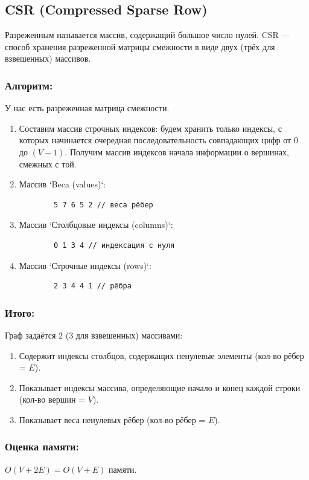 \subsection{CSR (Compressed Sparse Row)}
Разреженным называется массив, содержащий большое число нулей.
CSR --- способ хранения разреженной матрицы смежности в виде двух (трёх для взвешенных) массивов.

\subsubsection*{Алгоритм:}
У нас есть разреженная матрица смежности.
\begin{enumerate}
	\item Составим массив строчных индексов: будем хранить только индексы, с которых начинается очередная последовательность совпадающих цифр от 0 до $(V-1)$. Получим массив индексов начала информации о вершинах, смежных с той.
	\item Массив `Beca (values)`:
	\begin{verbatim}
		5 7 6 5 2 // веса рёбер
	\end{verbatim}
	\item Массив `Столбцовые индексы (columns)`:
	\begin{verbatim}
		0 1 3 4 // индексация с нуля
	\end{verbatim}
	\item Массив `Строчные индексы (rows)`:
	\begin{verbatim}
		2 3 4 4 1 // рёбра
	\end{verbatim}
\end{enumerate}

\subsubsection*{Итого:}
Граф задаётся 2 (3 для взвешенных) массивами:
\begin{enumerate}
	\item Содержит индексы столбцов, содержащих ненулевые элементы (кол-во рёбер = $E$).
	\item Показывает индексы массива, определяющие начало и конец каждой строки (кол-во вершин = $V$).
	\item Показывает веса ненулевых рёбер (кол-во рёбер = $E$).
\end{enumerate}

\subsubsection*{Оценка памяти:}
$O(V + 2E) = O(V + E)$ памяти.







